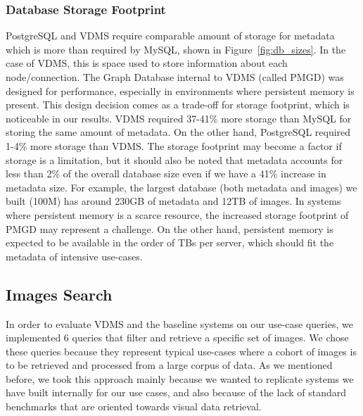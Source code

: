 \subsubsection{Database Storage Footprint}

PostgreSQL and VDMS require comparable amount of storage for metadata which
is more than required by MySQL, shown in Figure~\ref{fig:db_sizes}.
In the case of VDMS, this is space used to store information about
each node/connection.
The Graph Database internal to VDMS (called PMGD) was designed for performance,
especially in environments where persistent memory is present.
This design decision comes as a trade-off for storage footprint, which is
noticeable in our results.
VDMS required 37-41\% more storage than MySQL for storing the same amount
of metadata. On the other hand, PostgreSQL required 1-4\% more storage than VDMS.
The storage footprint may become a factor if storage is a limitation, but
it should also be noted that metadata accounts for less than 2\% of the
overall database size even if we have a 41\% increase in metadata size.
For example, the largest database (both metadata and images) we built
(100M) has around 230GB of metadata and 12TB of images.
In systems where persistent memory is a scarce resource,
the increased storage footprint of PMGD may represent a challenge.
On the other hand, persistent memory is expected to be available
in the order of TBs per server, which should fit the
metadata of intensive use-cases\cite{IntelXPoint15}.


\subsection{Images Search}
\label{images}

In order to evaluate VDMS and the baseline systems on our use-case queries,
we implemented 6 queries that filter and retrieve a specific set of images.
We chose these queries because they represent typical use-cases where a
cohort of images is to be retrieved and processed from a large corpus of data.
As we mentioned before, we took this approach mainly because we wanted to
replicate systems we have built internally for our use cases,
and also because of the lack of standard
benchmarks that are oriented towards visual data retrieval.

